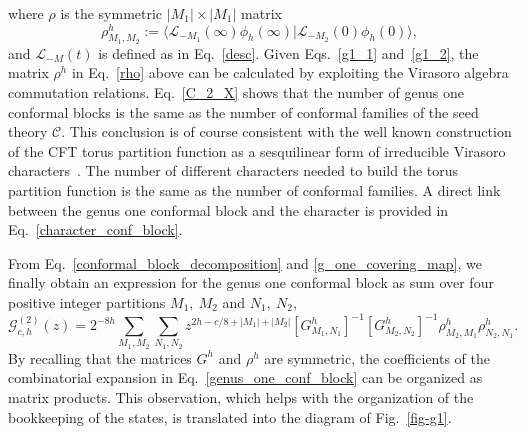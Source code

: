 \documentclass[a4paper,11pt]{article}
\begin{document}
where $\rho$ is the symmetric $|M_1|\times|M_1|$ matrix
\begin{equation}
\label{rho}
 \rho^h_{M_1,M_2}:=\langle\boldsymbol{\mathcal{L}}_{-M_1}(\infty)\phi_{h}(\infty)|\boldsymbol{\mathcal{L}}_{-M_2}(0)\phi_{h}(0)\rangle,
\end{equation}
and $\boldsymbol{\mathcal{L}}_{-M}(t)$ is defined as in Eq.~\eqref{desc}. Given Eqs.~\eqref{g1_1} and~\eqref{g1_2}, the matrix $\rho^h$  in Eq.~\eqref{rho} above can be calculated by exploiting the Virasoro algebra commutation relations.
Eq.~\eqref{C_2_X} shows that the number of genus one conformal blocks is
the same as the number of conformal families of the seed theory $\mathcal{C}$.
This conclusion is of course consistent with the well known construction of the CFT torus partition function as a sesquilinear form of irreducible Virasoro characters~\cite{Cappelli, Cappelli2}. The number of different characters needed to build the torus partition function  is  the same as the number of conformal families. A direct link between the genus one conformal block and the character is provided in Eq.~\eqref{character_conf_block}.

From Eq.~\eqref{conformal_block_decomposition} and \eqref{g_one_covering_map}, we finally obtain 
an expression for the genus one conformal block as sum over four positive integer partitions $M_1,~M_2$ and $N_1,~N_2$,
\begin{equation}\label{genus_one_conf_block}
 \mathcal{G}_{c, h}^{(2)}(z)=2^{-8h}\sum_{M_1, M_2}\sum_{N_1, N_2}
 z^{2h-c/8+|M_1|+|M_2|}[G^{h}_{M_1,N_1}]^{-1}[G^{h}_{ M_2,N_2}]^{-1}
 \rho^h_{M_2,M_1}\rho^h_{N_2,N_1}.
\end{equation}
By recalling that the matrices $G^h$ and $\rho^h$ are symmetric, the coefficients of the combinatorial 
expansion in Eq.~\eqref{genus_one_conf_block} can be organized as 
matrix products. This observation, which helps with the organization of the bookkeeping of the states, is translated  into  the diagram of Fig.~\ref{fig-g1}. 
\end{document}
